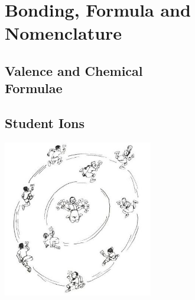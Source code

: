 \section{Bonding, Formula and Nomenclature}

\begin{multicols}{2}


\section*{Valence and Chemical \hfill \\ Formulae}   


\subsection{Student Ions}

\begin{center}
\includegraphics[width=0.49\textwidth]{./img/source/student-ions.jpg}
\end{center}


\end{multicols}
